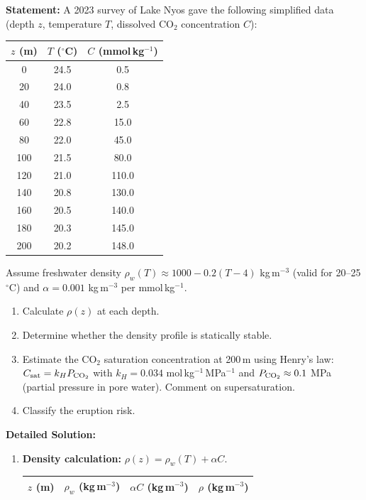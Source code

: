 \documentclass[11pt]{article}
\begin{document}
\begin{exoresolu}
\textbf{Statement:} A 2023 survey of Lake Nyos gave the following simplified data (depth $z$, temperature $T$, dissolved CO$_2$ concentration $C$):
\begin{center}
\begin{tabular}{|c|c|c|}\hline
$z$ (m) & $T$ ($^\circ$C) & $C$ (mmol\,kg$^{-1}$)\\\hline
0 & 24.5 & 0.5\\\hline
20 & 24.0 & 0.8\\\hline
40 & 23.5 & 2.5\\\hline
60 & 22.8 & 15.0\\\hline
80 & 22.0 & 45.0\\\hline
100 & 21.5 & 80.0\\\hline
120 & 21.0 & 110.0\\\hline
140 & 20.8 & 130.0\\\hline
160 & 20.5 & 140.0\\\hline
180 & 20.3 & 145.0\\\hline
200 & 20.2 & 148.0\\\hline
\end{tabular}
\end{center}
Assume freshwater density $\rho_w(T) \approx 1000 - 0.2(T-4)$ kg\,m$^{-3}$ (valid for 20–25$^\circ$C) and $\alpha = 0.001$ kg\,m$^{-3}$ per mmol\,kg$^{-1}$. 
\begin{enumerate}
\item Calculate $\rho(z)$ at each depth.
\item Determine whether the density profile is statically stable.
\item Estimate the CO$_2$ saturation concentration at 200\,m using Henry's law: $C_{\text{sat}} = k_H P_{\ce{CO2}}$ with $k_H = 0.034$ mol\,kg$^{-1}$\,MPa$^{-1}$ and $P_{\ce{CO2}} \approx 0.1$ MPa (partial pressure in pore water). Comment on supersaturation.
\item Classify the eruption risk.
\end{enumerate}
\tcblower
\textbf{Detailed Solution:}
\begin{enumerate}
\item \textbf{Density calculation:} $\rho(z) = \rho_w(T) + \alpha C$.
\begin{center}
\begin{tabular}{|c|c|c|c|}\hline
$z$ (m) & $\rho_w$ (kg\,m$^{-3}$) & $\alpha C$ (kg\,m$^{-3}$) & $\rho$ (kg\,m$^{-3}$)\\\hline

\end{tabular}
\end{center}
\end{enumerate}
\end{exoresolu}
\end{document}
